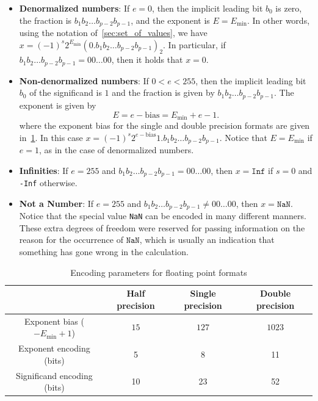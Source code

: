\begin{itemize}
    \item
        \textbf{Denormalized numbers}:
        If $e = 0$, then the implicit leading bit $b_0$ is zero,
        the fraction is $b_1 b_2 \dots b_{p-2} b_{p-1}$, and the exponent is $E = E_{\min}$.
        In other words, using the notation of~\cref{sec:set_of_values},
        we have $x = (-1)^s 2^{E_{\min}} (0.b_1b_2 \dots b_{p-2} b_{p-1})_2$.
        In particular, if $b_1 b_2 \dots b_{p-2} b_{p-1} = 00\dots00$,
        then it holds that $x = 0$.
    \item
        \textbf{Non-denormalized numbers}:
        If $0 < e < 255$,
        then the implicit leading bit $b_0$ of the significand is $1$
        and the fraction is given by $b_1 b_2 \dots b_{p-2} b_{p-1}$.
        The exponent is given by
        \[
            E = e - \mathrm{bias} = E_{\min} + e - 1.
        \]
        where the exponent bias for the single and double precision formats are given in~\cref{table:floating_point_formats_encoding}.
        In this case $x = (-1)^s 2^{e - \mathrm{bias}} 1.b_1b_2 \dots b_{p-2} b_{p-1}$.
        Notice that $E = E_{\min}$ if $e = 1$,
        as in the case of denormalized numbers.
    \item
        \textbf{Infinities}:
        If $e = 255$ and $b_1 b_2 \dots b_{p-2} b_{p-1} = 00\dots00$,
        then $x = \texttt{Inf}$ if $s = 0$ and \texttt{-Inf} otherwise.
    \item
        \textbf{Not a Number}:
        If $e = 255$ and  $b_1 b_2 \dots b_{p-2} b_{p-1} \neq 00\dots00$,
        then $x = \texttt{NaN}$.
        Notice that the special value \texttt{NaN} can be encoded in many different manners.
        These extra degrees of freedom were reserved for passing information on the reason for the occurrence of $\texttt{NaN}$,
        which is usually an indication that something has gone wrong in the calculation.
\end{itemize}

\begin{table}[ht]
    \centering
    \begin{tabular}{|c|c|c|c|}
        \hline
        & Half precision & Single precision & Double precision
        \\ \hline
        Exponent bias ($-E_{\min} + 1$) & $15$ & $127$ & $1023$
        \\ \hline
        Exponent encoding (bits) & 5 & 8 & 11
        \\ \hline
        Significand encoding (bits) & 10 & 23 & 52
        \\ \hline
    \end{tabular}
    \caption{Encoding parameters for floating point formats}%
    \label{table:floating_point_formats_encoding}
\end{table}

